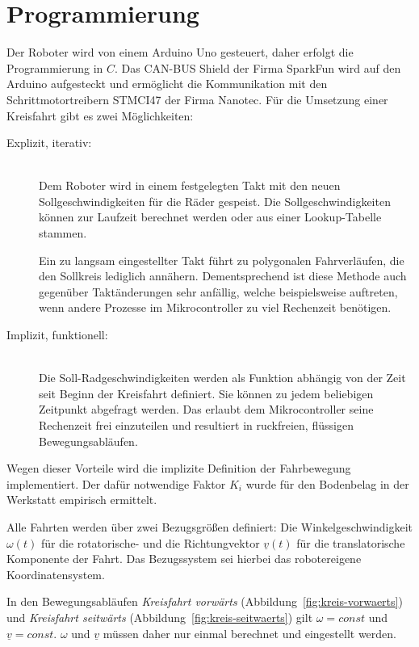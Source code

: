 \section{Programmierung}
Der Roboter wird von einem Arduino Uno gesteuert, daher erfolgt die Programmierung in $C$. Das CAN-BUS Shield der Firma SparkFun wird auf den Arduino aufgesteckt und ermöglicht die Kommunikation mit den Schrittmotortreibern STMCI47 der Firma Nanotec.
Für die Umsetzung einer Kreisfahrt gibt es zwei Möglichkeiten:

\begin{description}
\item[Explizit, iterativ:]~\\
Dem Roboter wird in einem festgelegten Takt mit den neuen Sollgeschwindigkeiten für die Räder gespeist. Die Sollgeschwindigkeiten können zur Laufzeit berechnet werden oder aus einer Lookup-Tabelle stammen.

Ein zu langsam eingestellter Takt führt zu polygonalen Fahrverläufen, die den Sollkreis lediglich annähern. Dementsprechend ist diese Methode auch gegenüber Taktänderungen sehr anfällig, welche beispielsweise auftreten, wenn andere Prozesse im Mikrocontroller zu viel Rechenzeit benötigen.

\item[Implizit, funktionell:]~\\
Die Soll-Radgeschwindigkeiten werden als Funktion abhängig von der Zeit seit Beginn der Kreisfahrt definiert. Sie können zu jedem beliebigen Zeitpunkt abgefragt werden. Das erlaubt dem Mikrocontroller seine Rechenzeit frei einzuteilen und resultiert in ruckfreien, flüssigen Bewegungsabläufen.
\end{description}

Wegen dieser Vorteile wird die implizite Definition der Fahrbewegung implementiert.
Der dafür notwendige Faktor $K_i$ wurde für den Bodenbelag in der Werkstatt empirisch ermittelt.

Alle Fahrten werden über zwei Bezugsgrößen definiert: Die Winkelgeschwindigkeit $\omega(t)$ für die rotatorische- und die Richtungvektor $\underline{v}(t)$ für die translatorische Komponente der Fahrt. Das Bezugssystem sei hierbei das robotereigene Koordinatensystem.

In den Bewegungsabläufen \emph{Kreisfahrt vorwärts} (Abbildung~\ref{fig:kreis-vorwaerts}) und \emph{Kreisfahrt seitwärts} (Abbildung~\ref{fig:kreis-seitwaerts}) gilt $\omega = const$ und $\underline{v} = const$. $\omega$ und $\underline{v}$ müssen daher nur einmal berechnet und eingestellt werden.

